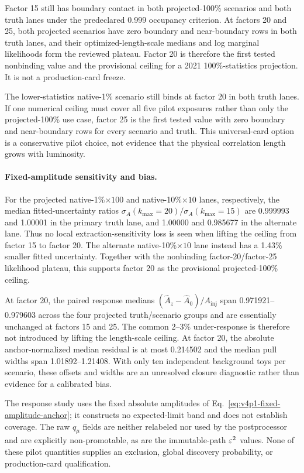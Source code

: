 Factor 15 still has boundary contact in both projected-100\% scenarios and both truth
lanes under the predeclared 0.999 occupancy criterion. At factors 20 and 25, both
projected scenarios have zero boundary and near-boundary rows in both truth lanes, and
their optimized-length-scale medians and log marginal likelihoods form the reviewed
plateau. Factor 20 is therefore the first tested nonbinding value and the provisional
ceiling for a 2021 100\%-statistics projection. It is not a production-card freeze.

The lower-statistics native-1\% scenario still binds at factor 20 in both truth lanes.
If one numerical ceiling must cover all five pilot exposures rather than only the
projected-100\% use case, factor 25 is the first tested value with zero boundary and
near-boundary rows for every scenario and truth. This universal-card option is a
conservative pilot choice, not evidence that the physical correlation length grows
with luminosity.

\paragraph{Fixed-amplitude sensitivity and bias.}
For the projected native-1\%$\times100$ and native-10\%$\times10$ lanes, respectively,
the median fitted-uncertainty ratios
$\sigma_A(k_{\max}=20)/\sigma_A(k_{\max}=15)$ are 0.999993 and 1.00001 in the
primary truth lane, and 1.00000 and 0.985677 in the alternate lane. Thus no local
extraction-sensitivity loss is seen when lifting the ceiling from factor 15 to factor
20. The alternate native-10\%$\times10$ lane instead has a 1.43\% smaller fitted
uncertainty. Together with the nonbinding factor-20/factor-25 likelihood plateau, this
supports factor 20 as the provisional projected-100\% ceiling.

At factor 20, the paired response medians
$(\hat A_z-\hat A_0)/A_{\mathrm{inj}}$ span 0.971921--0.979603 across the four
projected truth/scenario groups and are essentially unchanged at factors 15 and 25.
The common 2--3\% under-response is therefore not introduced by lifting the
length-scale ceiling. At factor 20, the absolute anchor-normalized median residual is
at most 0.214502 and the median pull widths span 1.01892--1.21408. With only ten
independent background toys per scenario, these offsets and widths are an unresolved
closure diagnostic rather than evidence for a calibrated bias.

The response study uses the fixed absolute amplitudes of
Eq.~\eqref{eq:v4p1-fixed-amplitude-anchor}; it constructs no expected-limit band and
does not establish coverage. The raw $q_\mu$ fields are neither relabeled nor used by
the postprocessor and are explicitly non-promotable, as are the immutable-path
$\varepsilon^2$ values. None of these pilot quantities supplies an exclusion, global
discovery probability, or production-card qualification.

